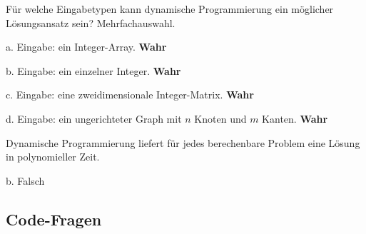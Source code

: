 \begin{contentbox}
Für welche Eingabetypen kann dynamische Programmierung ein möglicher Lösungsansatz sein? Mehrfachauswahl.
\begin{factlist}
    \item a. Eingabe: ein Integer-Array. \textbf{Wahr}
    \item b. Eingabe: ein einzelner Integer. \textbf{Wahr}
    \item c. Eingabe: eine zweidimensionale Integer-Matrix. \textbf{Wahr}
    \item d. Eingabe: ein ungerichteter Graph mit $n$ Knoten und $m$ Kanten. \textbf{Wahr}
\end{factlist}
\end{contentbox}

\begin{contentbox}
Dynamische Programmierung liefert für jedes berechenbare Problem eine Lösung in polynomieller Zeit.
\begin{factlist}
    \item b. Falsch
\end{factlist}
\end{contentbox}

\subsection{Code-Fragen}\label{sec:13-code-fragen}

